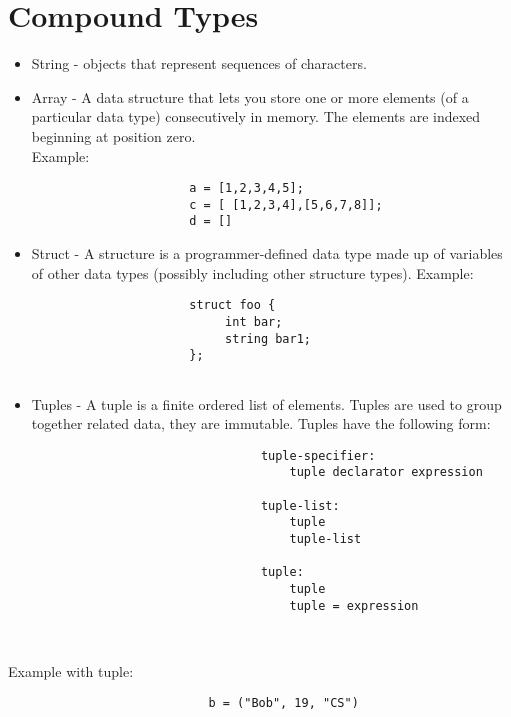 \documentclass[./LRM_main.tex]{subfiles}
\begin{document}
\section{Compound Types}
\begin{itemize}
    \item String - objects that represent sequences of characters. 
    \item Array - A data structure that lets you store one or more elements (of a particular data type) consecutively in memory. The elements are indexed beginning at position zero. 
    \\Example:

\begin{lstlisting}
                      a = [1,2,3,4,5];
		              c = [ [1,2,3,4],[5,6,7,8]];
		              d = []
\end{lstlisting}
    \item Struct - A structure is a programmer-defined data type made up of variables of other data types (possibly including other structure types). 
 Example:
        \begin{lstlisting}		              
		              struct foo {
			               int bar;
			               string bar1;
                      };
		      

\end{lstlisting}
        

    \item Tuples - A tuple is a finite ordered list of elements. Tuples are used to group together related data, they are immutable. Tuples have the following form:
    \begin{lstlisting}
                                tuple-specifier:
                                    tuple declarator expression
                                    
                                tuple-list:
                                    tuple
                                    tuple-list
                                    
                                tuple:
                                    tuple
                                    tuple = expression
                                    
                                    
    \end{lstlisting}
    
\end{itemize}

Example with tuple:
\begin{lstlisting}
                            b = ("Bob", 19, "CS")
\end{lstlisting}



\end{document}
